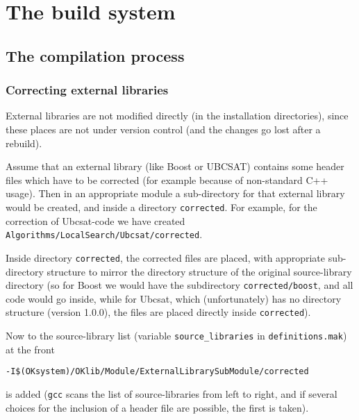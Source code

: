 \documentclass{book}
\newcommand{\filename}[1]{\texttt{#1}}
\newcommand{\name}[1]{\texttt{#1}}
\begin{document}
\part{The build system}
\label{par:Build}




\chapter{The compilation process}
\label{cha:BuildCompilation}

\section{Correcting external libraries}
\label{sec:Correctingexternallibraries}

External libraries are not modified directly (in the installation directories), since these places are not under version control (and the changes go lost after a rebuild).

Assume that an external library (like Boost or UBCSAT) contains some header files which have to be corrected (for example because of non-standard C++ usage). Then in an appropriate module a sub-directory for that external library would be created, and inside a directory \filename{corrected}. For example, for the correction of Ubcsat-code we have created \filename{Algorithms/LocalSearch/Ubcsat/corrected}.

Inside directory \filename{corrected}, the corrected files are placed, with appropriate sub-directory structure to mirror the directory structure of the original source-library directory (so for Boost we would have the subdirectory \filename{corrected/boost}, and all code would go inside, while for Ubcsat, which (unfortunately) has no directory structure (version 1.0.0), the files are placed directly inside \filename{corrected}).

Now to the source-library list (variable \name{source\_libraries} in \filename{definitions.mak}) at the front 
\begin{verbatim}
-I$(OKsystem)/OKlib/Module/ExternalLibrarySubModule/corrected
\end{verbatim} is added (\name{gcc} scans the list of source-libraries from left to right, and if several choices for the inclusion of a header file are possible, the first is taken).
\end{document}
